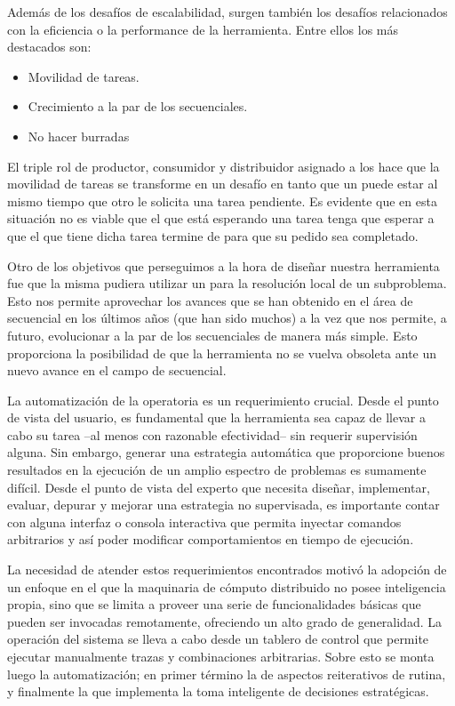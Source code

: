 Además de los desafíos de escalabilidad, surgen también los desafíos
relacionados con la eficiencia o la performance de la herramienta. Entre ellos
los más destacados son:

\begin{itemize}
	\item Movilidad de tareas.
	\item Crecimiento a la par de los \ssolvers secuenciales.
	\item No hacer burradas 
\end{itemize}

El triple rol de productor, consumidor y distribuidor asignado a los \ws hace
que la movilidad de tareas se transforme en un desafío en tanto que un \w
puede estar \solveando al mismo tiempo que otro \w le solicita una tarea
pendiente. Es evidente que en esta situación no es viable que el \w que está
esperando una tarea tenga que esperar a que el \w que tiene dicha tarea
termine de \solvear para que su pedido sea completado.

Otro de los objetivos que perseguimos a la hora de diseñar nuestra herramienta
fue que la misma pudiera utilizar un \ssolver \ots para la resolución local de
un subproblema. Esto nos permite aprovechar los avances que se han obtenido en
el área de \ssolving secuencial en los últimos años (que han sido muchos) a la
vez que nos permite, a futuro, evolucionar a la par de los \ssolvers
secuenciales de manera más simple. Esto proporciona la posibilidad de que la
herramienta no se vuelva obsoleta ante un nuevo avance en el campo de
\ssolving secuencial.

\newcommand{\rt}{\emph{run-time}\xspace}
\newcommand{\apriori}{\emph{a priori}\xspace}

La automatización de la operatoria es un requerimiento crucial. Desde el punto
de vista del usuario, es fundamental que la herramienta sea capaz de llevar a
cabo su tarea --al menos con razonable efectividad-- sin requerir supervisión alguna.
Sin embargo, generar una estrategia automática que proporcione buenos resultados
en la ejecución de un amplio espectro de problemas es sumamente difícil. Desde el
punto de vista del experto que necesita diseñar, implementar, evaluar, depurar y
mejorar una estrategia no supervisada, es importante contar con alguna
interfaz o consola interactiva que permita inyectar comandos arbitrarios y
así poder modificar comportamientos en tiempo de ejecución.

La necesidad de atender estos requerimientos encontrados motivó la adopción de
un enfoque en el que la maquinaria de cómputo distribuido no posee inteligencia
propia, sino que se limita a proveer una serie de funcionalidades básicas que
pueden ser invocadas remotamente, ofreciendo un alto grado de generalidad. La
operación del sistema se lleva a cabo desde un tablero de control que permite
ejecutar manualmente trazas y combinaciones arbitrarias. Sobre esto se monta
luego la automatización; en primer término la de aspectos reiterativos de rutina,
y finalmente la que implementa la toma inteligente de decisiones estratégicas.

